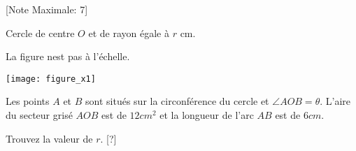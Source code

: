 \begin{question}
  \hspace*{\fill} [Note Maximale: 7]\par
  \begin{center} %
    \noindent Cercle de centre $O$ et de rayon égale à $r$ cm.\par
    \noindent La figure nest pas à l'échelle.\par
    \texttt{[image: figure\_x1]}\par

  \end{center} %

  \noindent Les points $A$ et $B$ sont situés sur la circonférence du cercle et $\angle AOB = \theta$. L'aire du secteur grisé $AOB$ est de $12 cm^2$ et la longueur de l'arc $AB$ est de $6 cm$.\par
  \medskip
   \noindent Trouvez la valeur de $r$.\hspace*{\fill} [?]\par
\end{question}
